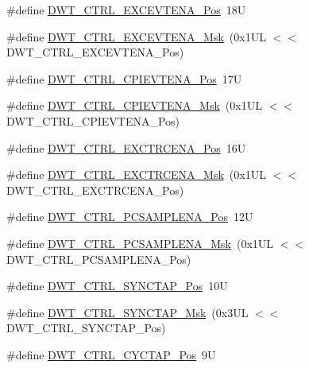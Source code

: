 \begin{DoxyCompactItemize}
\item 
\#define \hyperlink{group___c_m_s_i_s___d_w_t_gaf4e73f548ae3e945ef8b1d9ff1281544}{D\+W\+T\+\_\+\+C\+T\+R\+L\+\_\+\+E\+X\+C\+E\+V\+T\+E\+N\+A\+\_\+\+Pos}~18U
\item 
\#define \hyperlink{group___c_m_s_i_s___d_w_t_gab7ee0def33423b5859ca4030dff63b58}{D\+W\+T\+\_\+\+C\+T\+R\+L\+\_\+\+E\+X\+C\+E\+V\+T\+E\+N\+A\+\_\+\+Msk}~(0x1\+U\+L $<$$<$ D\+W\+T\+\_\+\+C\+T\+R\+L\+\_\+\+E\+X\+C\+E\+V\+T\+E\+N\+A\+\_\+\+Pos)
\item 
\#define \hyperlink{group___c_m_s_i_s___d_w_t_ga9fff0b71fb0be1499f5180c6bce1fc8f}{D\+W\+T\+\_\+\+C\+T\+R\+L\+\_\+\+C\+P\+I\+E\+V\+T\+E\+N\+A\+\_\+\+Pos}~17U
\item 
\#define \hyperlink{group___c_m_s_i_s___d_w_t_ga189089c30aade60b983df17ad2412f6f}{D\+W\+T\+\_\+\+C\+T\+R\+L\+\_\+\+C\+P\+I\+E\+V\+T\+E\+N\+A\+\_\+\+Msk}~(0x1\+U\+L $<$$<$ D\+W\+T\+\_\+\+C\+T\+R\+L\+\_\+\+C\+P\+I\+E\+V\+T\+E\+N\+A\+\_\+\+Pos)
\item 
\#define \hyperlink{group___c_m_s_i_s___d_w_t_ga05f13b547a9a1e63e003ee0bc6446d0d}{D\+W\+T\+\_\+\+C\+T\+R\+L\+\_\+\+E\+X\+C\+T\+R\+C\+E\+N\+A\+\_\+\+Pos}~16U
\item 
\#define \hyperlink{group___c_m_s_i_s___d_w_t_gaf4fbb509ab3cbb768f16484c660a24c3}{D\+W\+T\+\_\+\+C\+T\+R\+L\+\_\+\+E\+X\+C\+T\+R\+C\+E\+N\+A\+\_\+\+Msk}~(0x1\+U\+L $<$$<$ D\+W\+T\+\_\+\+C\+T\+R\+L\+\_\+\+E\+X\+C\+T\+R\+C\+E\+N\+A\+\_\+\+Pos)
\item 
\#define \hyperlink{group___c_m_s_i_s___d_w_t_ga1e14afc7790fcb424fcf619e192554c9}{D\+W\+T\+\_\+\+C\+T\+R\+L\+\_\+\+P\+C\+S\+A\+M\+P\+L\+E\+N\+A\+\_\+\+Pos}~12U
\item 
\#define \hyperlink{group___c_m_s_i_s___d_w_t_gafdcf1c86f43fbeaf2780ce797c9ef3d6}{D\+W\+T\+\_\+\+C\+T\+R\+L\+\_\+\+P\+C\+S\+A\+M\+P\+L\+E\+N\+A\+\_\+\+Msk}~(0x1\+U\+L $<$$<$ D\+W\+T\+\_\+\+C\+T\+R\+L\+\_\+\+P\+C\+S\+A\+M\+P\+L\+E\+N\+A\+\_\+\+Pos)
\item 
\#define \hyperlink{group___c_m_s_i_s___d_w_t_ga678ef08786edcbef964479217efb9284}{D\+W\+T\+\_\+\+C\+T\+R\+L\+\_\+\+S\+Y\+N\+C\+T\+A\+P\+\_\+\+Pos}~10U
\item 
\#define \hyperlink{group___c_m_s_i_s___d_w_t_gaf1e6c3729d56ecadeb6eeff4d225968c}{D\+W\+T\+\_\+\+C\+T\+R\+L\+\_\+\+S\+Y\+N\+C\+T\+A\+P\+\_\+\+Msk}~(0x3\+U\+L $<$$<$ D\+W\+T\+\_\+\+C\+T\+R\+L\+\_\+\+S\+Y\+N\+C\+T\+A\+P\+\_\+\+Pos)
\item 
\#define \hyperlink{group___c_m_s_i_s___d_w_t_gaf70b80936c7db60bf84fb6dadb8a3559}{D\+W\+T\+\_\+\+C\+T\+R\+L\+\_\+\+C\+Y\+C\+T\+A\+P\+\_\+\+Pos}~9U
$$
\end{DoxyCompactItemize}
